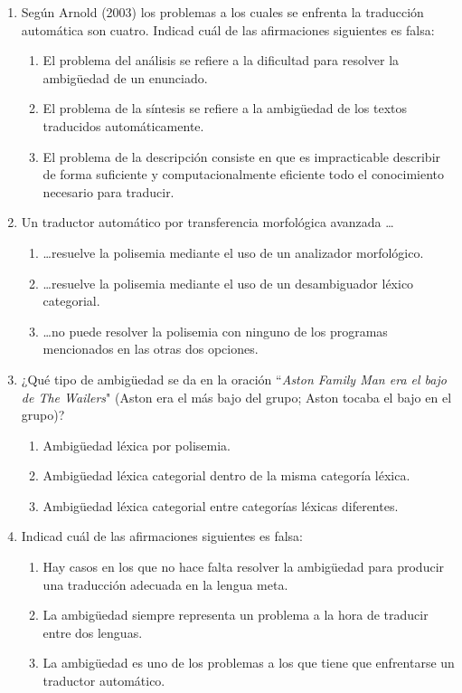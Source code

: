 \begin{enumerate}
\item Según Arnold (2003) los problemas a los cuales se enfrenta la traducción automática son cuatro. Indicad cuál de las afirmaciones siguientes es falsa: \begin{enumerate} \item El problema del análisis se refiere a la dificultad para resolver la ambigüedad de un enunciado. \item El problema de la síntesis se refiere a la ambigüedad de los textos traducidos automáticamente. \item El problema de la descripción consiste en que es impracticable describir de forma suficiente y computacionalmente eficiente todo el conocimiento necesario para traducir. \end{enumerate} 

\item Un traductor automático por transferencia morfológica avanzada \ldots \begin{enumerate} \item \ldots resuelve la polisemia mediante el uso de un analizador morfológico. \item \ldots resuelve la polisemia mediante el uso de un desambiguador léxico categorial. \item \ldots no puede resolver la polisemia con ninguno de los programas mencionados en las otras dos opciones. \end{enumerate} 

\item ¿Qué tipo de ambigüedad se da en la oración ``\emph{Aston Family Man era el bajo de The Wailers}" (Aston era el más bajo del grupo; Aston tocaba el bajo en el grupo)? \begin{enumerate} \item Ambigüedad léxica por polisemia. \item Ambigüedad léxica categorial dentro de la misma categoría léxica. \item Ambigüedad léxica categorial entre categorías léxicas diferentes. \end{enumerate} 

\item Indicad cuál de las afirmaciones siguientes es falsa: \begin{enumerate} \item Hay casos en los que no hace falta resolver la ambigüedad para producir una traducción adecuada en la lengua meta. \item La ambigüedad siempre representa un problema a la hora de traducir entre dos lenguas. \item La ambigüedad es uno de los problemas a los que tiene que enfrentarse un traductor automático. \end{enumerate} \end{enumerate} 

